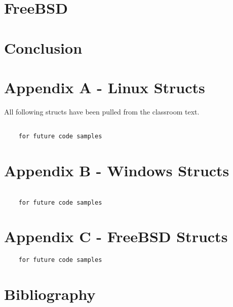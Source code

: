 \documentclass[10pt,letterpaper,onecolumn,draftclsnofoot]{IEEEtran}
\begin{document}
  \subsection{}
  \subsection{}
  \section{FreeBSD}
  \subsection{}
  \subsection{}
  \section{Conclusion}

  \clearpage
  \section{Appendix A - Linux Structs}
  All following structs have been pulled from the classroom text. \cite{robertlove2010}
  \begin{lstlisting}

    for future code samples

  \end{lstlisting}

  \section{Appendix B - Windows Structs}
  \begin{lstlisting}

    for future code samples
  \end{lstlisting}
  \section{Appendix C - FreeBSD Structs}
  \begin{lstlisting}
    for future code samples

  \end{lstlisting}

  \section{Bibliography}
  
  
\end{document}
